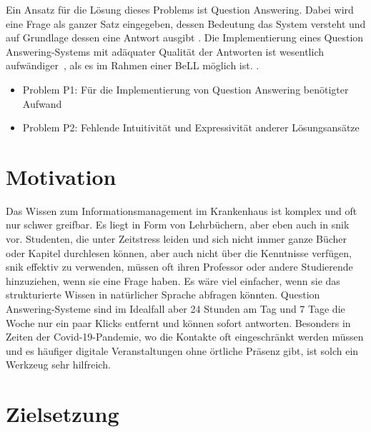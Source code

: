 Ein Ansatz für die Lösung dieses Problems ist Question Answering.
Dabei wird eine Frage als ganzer Satz eingegeben, dessen Bedeutung das System versteht und auf Grundlage dessen eine Antwort ausgibt \citep{qadefinition}.
Die Implementierung eines Question Answering-Systems mit adäquater Qualität der Antworten ist wesentlich aufwändiger~\citep[S.~3]{qanswer}, als es im Rahmen einer BeLL möglich ist.
.
\begin{itemize}
	\item Problem P1: Für die Implementierung von Question Answering benötigter Aufwand
	\item Problem P2: Fehlende Intuitivität und Expressivität anderer Lösungsansätze
\end{itemize}

\section{Motivation}

Das Wissen zum Informationsmanagement im Krankenhaus ist komplex und oft nur schwer greifbar.
Es liegt in Form von Lehrbüchern, aber eben auch in \acs{snik} vor.
Studenten, die unter Zeitstress leiden und sich nicht immer ganze Bücher oder Kapitel durchlesen können, aber auch nicht über die Kenntnisse verfügen, \acs{snik} effektiv zu verwenden,
müssen oft ihren Professor oder andere Studierende hinzuziehen, wenn sie eine Frage haben.
Es wäre viel einfacher, wenn sie das strukturierte Wissen in natürlicher Sprache abfragen könnten.
Question Answering-Systeme sind im Idealfall aber 24 Stunden am Tag und 7 Tage die Woche nur ein paar Klicks entfernt und können sofort antworten. 
Besonders in Zeiten der Covid-19-Pandemie, wo die Kontakte oft eingeschränkt werden müssen und es häufiger digitale Veranstaltungen ohne örtliche Präsenz gibt, ist solch ein Werkzeug sehr hilfreich.

\section{Zielsetzung}\label{sec:zielsetzung}

